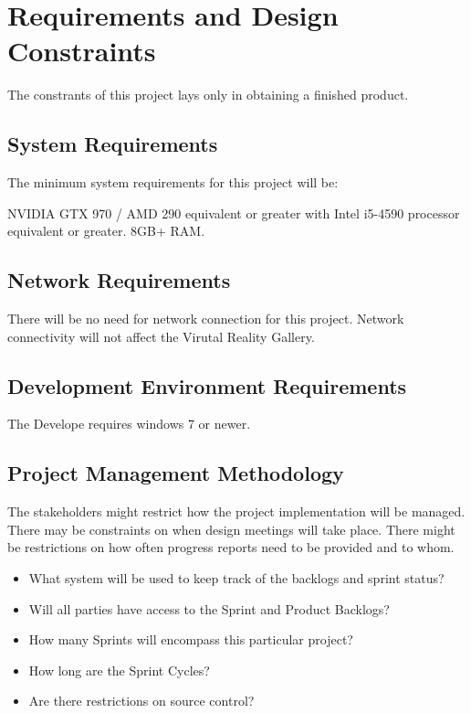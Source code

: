 \section{Requirements and Design Constraints}
The constrants of this project lays only in obtaining a finished product. 



\subsection{System  Requirements}
The minimum system requirements for this project will be:

NVIDIA GTX 970 / AMD 290 equivalent or greater with Intel i5-4590 processor equivalent or greater. 8GB+ RAM.




\subsection{Network Requirements}
There will be no need for network connection for this project. Network connectivity will not 
affect the Virutal Reality Gallery.


\subsection{Development Environment Requirements}
The Develope requires windows 7 or newer.



\subsection{Project  Management Methodology}
The stakeholders might restrict how the project implementation will be managed. 
 There may be constraints on when design meetings will take place.  There might 
be restrictions on how often progress reports need to be provided and to whom. 
 
\begin{itemize}
\item What system will be used to keep track of the backlogs and sprint status?
\item Will all parties have access to the Sprint and Product Backlogs?
\item How many Sprints will encompass this particular project?
\item How long are the Sprint Cycles?
\item Are there restrictions on source control? 
\end{itemize}

